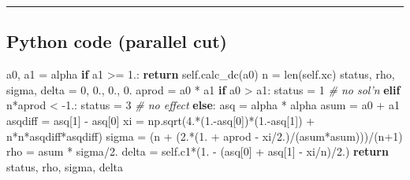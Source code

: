 \documentclass[]{article}
\newenvironment{Shaded}{}{}
\newcommand{\BuiltInTok}[1]{#1}
\newcommand{\CommentTok}[1]{\textcolor[rgb]{0.38,0.63,0.69}{\textit{#1}}}
\newcommand{\ControlFlowTok}[1]{\textcolor[rgb]{0.00,0.44,0.13}{\textbf{#1}}}
\newcommand{\DecValTok}[1]{\textcolor[rgb]{0.25,0.63,0.44}{#1}}
\newcommand{\FloatTok}[1]{\textcolor[rgb]{0.25,0.63,0.44}{#1}}
\newcommand{\NormalTok}[1]{#1}
\newcommand{\OperatorTok}[1]{\textcolor[rgb]{0.40,0.40,0.40}{#1}}
\newcommand{\VariableTok}[1]{\textcolor[rgb]{0.10,0.09,0.49}{#1}}
\begin{document}
\begin{center}\rule{0.5\linewidth}{\linethickness}\end{center}

\hypertarget{python-code-parallel-cut}{%
\subsection{Python code (parallel cut)}\label{python-code-parallel-cut}}

\begin{Shaded}
\begin{Highlighting}[]
\NormalTok{a0, a1 }\OperatorTok{=}\NormalTok{ alpha}
\ControlFlowTok{if}\NormalTok{ a1 }\OperatorTok{>=} \FloatTok{1.}\NormalTok{: }\ControlFlowTok{return} \VariableTok{self}\NormalTok{.calc_dc(a0)}
\NormalTok{n }\OperatorTok{=} \BuiltInTok{len}\NormalTok{(}\VariableTok{self}\NormalTok{.xc)}
\NormalTok{status, rho, sigma, delta }\OperatorTok{=} \DecValTok{0}\NormalTok{, }\FloatTok{0.}\NormalTok{, }\FloatTok{0.}\NormalTok{, }\FloatTok{0.}
\NormalTok{aprod }\OperatorTok{=}\NormalTok{ a0 }\OperatorTok{*}\NormalTok{ a1}
\ControlFlowTok{if}\NormalTok{ a0 }\OperatorTok{>}\NormalTok{ a1: }
\NormalTok{    status }\OperatorTok{=} \DecValTok{1} \CommentTok{# no sol'n}
\ControlFlowTok{elif}\NormalTok{ n}\OperatorTok{*}\NormalTok{aprod }\OperatorTok{<} \FloatTok{-1.}\NormalTok{: }
\NormalTok{    status }\OperatorTok{=} \DecValTok{3}  \CommentTok{# no effect}
\ControlFlowTok{else}\NormalTok{:}
\NormalTok{    asq }\OperatorTok{=}\NormalTok{ alpha }\OperatorTok{*}\NormalTok{ alpha}
\NormalTok{    asum }\OperatorTok{=}\NormalTok{ a0 }\OperatorTok{+}\NormalTok{ a1}
\NormalTok{    asqdiff }\OperatorTok{=}\NormalTok{ asq[}\DecValTok{1}\NormalTok{] }\OperatorTok{-}\NormalTok{ asq[}\DecValTok{0}\NormalTok{]}
\NormalTok{    xi }\OperatorTok{=}\NormalTok{ np.sqrt(}\FloatTok{4.}\OperatorTok{*}\NormalTok{(}\FloatTok{1.}\OperatorTok{-}\NormalTok{asq[}\DecValTok{0}\NormalTok{])}\OperatorTok{*}\NormalTok{(}\FloatTok{1.}\OperatorTok{-}\NormalTok{asq[}\DecValTok{1}\NormalTok{]) }\OperatorTok{+}\NormalTok{ n}\OperatorTok{*}\NormalTok{n}\OperatorTok{*}\NormalTok{asqdiff}\OperatorTok{*}\NormalTok{asqdiff)}
\NormalTok{    sigma }\OperatorTok{=}\NormalTok{ (n }\OperatorTok{+}\NormalTok{ (}\FloatTok{2.}\OperatorTok{*}\NormalTok{(}\FloatTok{1.} \OperatorTok{+}\NormalTok{ aprod }\OperatorTok{-}\NormalTok{ xi}\OperatorTok{/}\FloatTok{2.}\NormalTok{)}\OperatorTok{/}\NormalTok{(asum}\OperatorTok{*}\NormalTok{asum)))}\OperatorTok{/}\NormalTok{(n}\OperatorTok{+}\DecValTok{1}\NormalTok{)}
\NormalTok{    rho }\OperatorTok{=}\NormalTok{ asum }\OperatorTok{*}\NormalTok{ sigma}\OperatorTok{/}\FloatTok{2.}
\NormalTok{    delta }\OperatorTok{=} \VariableTok{self}\NormalTok{.c1}\OperatorTok{*}\NormalTok{(}\FloatTok{1.} \OperatorTok{-}\NormalTok{ (asq[}\DecValTok{0}\NormalTok{] }\OperatorTok{+}\NormalTok{ asq[}\DecValTok{1}\NormalTok{] }\OperatorTok{-}\NormalTok{ xi}\OperatorTok{/}\NormalTok{n)}\OperatorTok{/}\FloatTok{2.}\NormalTok{)        }
\ControlFlowTok{return}\NormalTok{ status, rho, sigma, delta}
\end{Highlighting}
\end{Shaded}
\end{document}
